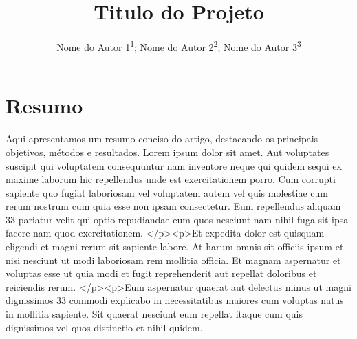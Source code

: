 \documentclass[12pt]{article}
\title{\textbf{Titulo do Projeto}} %
\author{
  {\footnotesize Nome do Autor 1}\textsuperscript{1};
  {\footnotesize Nome do Autor 2}\textsuperscript{2};
  {\footnotesize Nome do Autor 3}\textsuperscript{3}
}
\begin{document}
\date{}
\maketitle %
\thispagestyle{fancy} %
\titleformat{\section}{\normalfont\fontsize{14pt}{16pt}\bfseries}{\thesection}{1em}{} %
\section*{Resumo} %
Aqui apresentamos um resumo conciso do artigo, destacando os principais objetivos, métodos e resultados. Lorem ipsum dolor sit amet. Aut voluptates suscipit qui voluptatem consequuntur nam inventore neque qui quidem sequi ex maxime laborum hic repellendus unde est exercitationem porro. Cum corrupti sapiente quo fugiat laboriosam vel voluptatem autem vel quis molestiae cum rerum nostrum cum quia esse non ipsam consectetur. Eum repellendus aliquam 33 pariatur velit qui optio repudiandae eum quos nesciunt nam nihil fuga sit ipsa facere nam quod exercitationem. </p><p>Et expedita dolor est quisquam eligendi et magni rerum sit sapiente labore. At harum omnis sit officiis ipsum et nisi nesciunt ut modi laboriosam rem mollitia officia. Et magnam aspernatur et voluptas esse ut quia modi et fugit reprehenderit aut repellat doloribus et reiciendis rerum. </p><p>Eum aspernatur quaerat aut delectus minus ut magni dignissimos 33 commodi explicabo in necessitatibus maiores cum voluptas natus in mollitia sapiente. Sit quaerat nesciunt eum repellat itaque cum quis dignissimos vel quos distinctio et nihil quidem.
\end{document}

